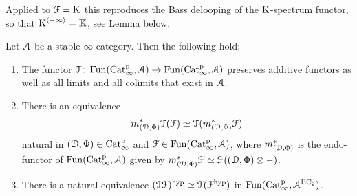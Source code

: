Applied to $\F = \K$ this reproduces the Bass delooping of the $\K$-spectrum functor, so that $\K^{\cotower{-\infty}} = \KK$, see Lemma  below.


\begin{lemma}
\label{lemma:preserves-limits}%
Let $\A$ be a stable $\infty$-category. Then the following hold:
\begin{enumerate}
\item
\label{item:T-preserves-limits-and-colimits}%
The functor $\T \colon \Fun(\Catp,\A) \to \Fun(\Catp,\A)$ preserves additive functors as well as all limits and all colimits that exist in $\A$.
\item
\label{item:T-commutes-translation}%
There is an equivalence
\[
m_{(\D,\QFD)}^*\T(\F) \simeq \T(m_{(\D,\QFD)}^*\F)
\]
natural in $(\D,\QFD) \in \Catp$ and $\F\in \Fun(\Catp,\A)$, where $m_{(\D,\QFD)}^*$ is the endo-functor of $\Fun(\Catp,\A)$ given by $m_{(\D,\QFD)}^*\F \simeq \F((\D,\QFD) \otimes -)$. \item
\label{item:TFhyp-equivalence}%
There is a natural equivalence $(\T\F)^{\hyp} \simeq \T(\F^{\hyp})$ in $\Fun(\Catp,\A^{\B\Ct})$. 
\end{enumerate}
\end{lemma}
